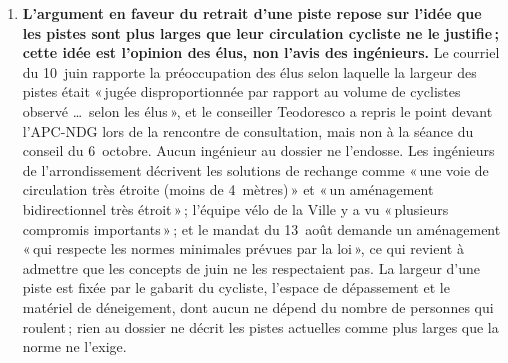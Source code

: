\documentclass[11pt,letterpaper]{article}
\begin{document}
\begin{enumerate}[nosep]
\begin{minipage}[t]{\linewidth}
    le 9~octobre («\,at least 50 to 60 parking spots\,», en ajoutant qu'il
    était «\,a bit too early\,» et qu'il restait «\,a few rounds during the
    workshops with the services\,» avant «\,the final number\,»), ne
    figurent nulle part dans les documents communiqués. Le mandat demande au consultant de compter les cases qu'un
    aménagement «\,pourrait permettre de recréer\,» et de mesurer
    «\,l'amélioration de la disponibilité du stationnement\,»\,; l'offre
    promet une analyse de «\,l'impact sur le nombre de places\,» et ne
    prévoit aucun travail de terrain\,; le consultant a travaillé à partir
    d'imagerie aérienne. Ce que la note dit du stationnement est donc un
    décompte de cases qu'on pourrait tracer, non une mesure du besoin. Rien
    dans le dossier n'indique combien de nuits d'hiver le stationnement
    près de Terrebonne est réellement complet.\end{minipage}\vspace{0.35em}
\item \begin{minipage}[t]{\linewidth}\textbf{L'argument en faveur du retrait d'une piste repose sur l'idée
    que les pistes sont plus larges que leur circulation cycliste ne le
    justifie\,; cette idée est l'opinion des élus, non l'avis des
    ingénieurs.} Le courriel du 10~juin rapporte la préoccupation des élus
    selon laquelle la largeur des pistes était «\,jugée disproportionnée par
    rapport au volume de cyclistes observé \ldots\ selon les élus\,», et le
    conseiller Teodoresco a repris le point devant l'APC-NDG lors de la
    rencontre de consultation, mais non à la séance du conseil du
    6~octobre. Aucun ingénieur au dossier ne l'endosse. Les ingénieurs de
    l'arrondissement décrivent les solutions de rechange comme «\,une voie de
    circulation très étroite (moins de 4~mètres)\,» et «\,un aménagement
    bidirectionnel très étroit\,»\,; l'équipe vélo de la Ville y a vu
    «\,plusieurs compromis importants\,»\,; et le mandat du 13~août demande
    un aménagement «\,qui respecte les normes minimales prévues par la
    loi\,», ce qui revient à admettre que les concepts de juin ne les
    respectaient pas. La largeur d'une piste est fixée par le gabarit du
    cycliste, l'espace de dépassement et le matériel de déneigement, dont
    aucun ne dépend du nombre de personnes qui roulent\,; rien au dossier ne
    décrit les pistes actuelles comme plus larges que la norme ne
    l'exige.\end{minipage}\vspace{0.35em}

\end{enumerate}
\end{document}
